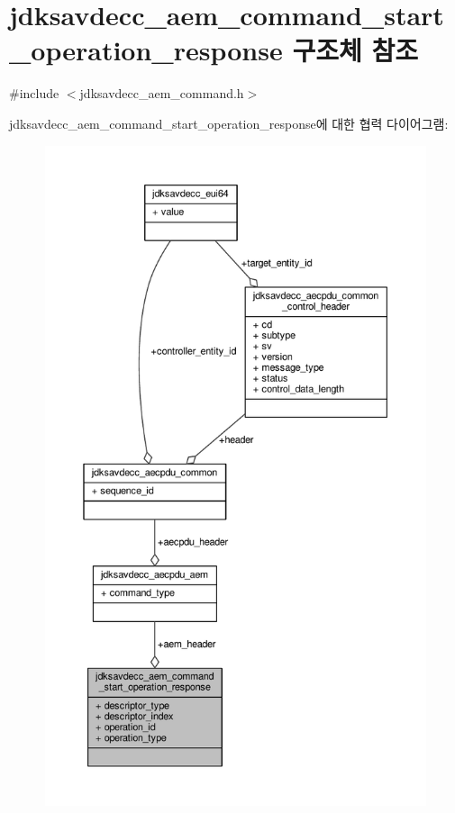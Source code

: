 \hypertarget{structjdksavdecc__aem__command__start__operation__response}{}\section{jdksavdecc\+\_\+aem\+\_\+command\+\_\+start\+\_\+operation\+\_\+response 구조체 참조}
\label{structjdksavdecc__aem__command__start__operation__response}


{\ttfamily \#include $<$jdksavdecc\+\_\+aem\+\_\+command.\+h$>$}



jdksavdecc\+\_\+aem\+\_\+command\+\_\+start\+\_\+operation\+\_\+response에 대한 협력 다이어그램\+:
\nopagebreak
\begin{figure}[H]
\begin{center}
\leavevmode
\includegraphics[height=550pt]{structjdksavdecc__aem__command__start__operation__response__coll__graph}
\end{center}
\end{figure}
